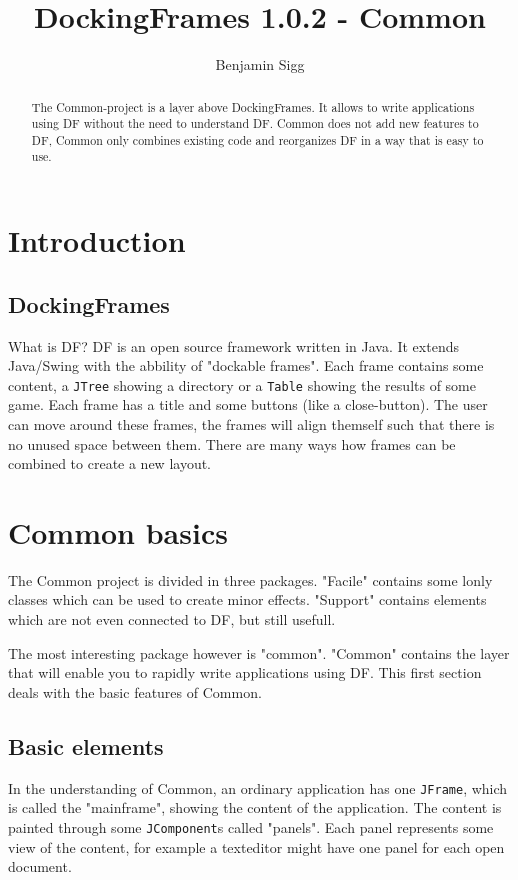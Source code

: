 \documentclass[a4paper,10pt]{article}
\title{DockingFrames 1.0.2 - Common}
\author{Benjamin Sigg}
\newcommand{\src}[1]{\lstinline[basicstyle=\ttfamily]|#1|}
\begin{document}
\maketitle
\tableofcontents
\newpage

\begin{abstract}
The Common-project is a layer above DockingFrames. It allows to write applications using DF without the need to understand DF. Common does not add new features to DF, Common only combines existing code and reorganizes DF in a way that is easy to use.
\end{abstract}

\section{Introduction}
\subsection{DockingFrames}
What is DF? DF is an open source framework written in Java. It extends Java/Swing with the abbility of "dockable frames". Each frame contains some content, a \src{JTree} showing a directory or a \src{Table} showing the results of some game. Each frame has a title and some buttons (like a close-button). The user can move around these frames, the frames will align themself such that there is no unused space between them. There are many ways how frames can be combined to create a new layout.

\section{Common basics}
The Common project is divided in three packages. "Facile" contains some lonly classes which can be used to create minor effects. "Support" contains elements which are not even connected to DF, but still usefull.

The most interesting package however is "common". "Common" contains the layer that will enable you to rapidly write applications using DF. This first section deals with the basic features of Common.

\subsection{Basic elements}
In the understanding of Common, an ordinary application has one \src{JFrame}, which is called the "mainframe", showing the content of the application. The content is painted through some \src{JComponent}s called "panels". Each panel represents some view of the content, for example a texteditor might have one panel for each open document.
\end{document}
